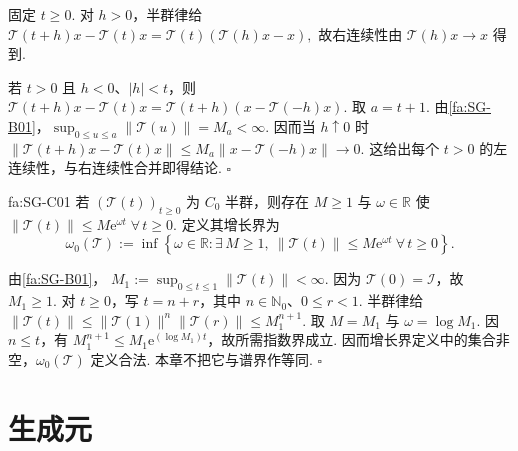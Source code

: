 \begin{FAProof}
固定 \(\displaystyle t\geqslant0\). 对 \(\displaystyle h>0\)，半群律给
\(\displaystyle \mathcal T(t+h)x-\mathcal T(t)x = \mathcal T(t)(\mathcal T(h)x-x),\)
故右连续性由 \(\displaystyle\mathcal T(h)x\to x\) 得到.

若 \(\displaystyle t>0\) 且 \(\displaystyle h<0\)、\(\displaystyle|h|<t\)，则
\(\displaystyle \mathcal T(t+h)x-\mathcal T(t)x = \mathcal T(t+h)(x-\mathcal T(-h)x).\)
取 \(\displaystyle a=t+1\). 由\autoref{fa:SG-B01}，\(\displaystyle\sup_{0\leqslant u\leqslant a}\|\mathcal T(u)\|=M_a<\infty\). 因而当 \(\displaystyle h\uparrow0\) 时
\(\displaystyle \|\mathcal T(t+h)x-\mathcal T(t)x\| \leqslant M_a\|x-\mathcal T(-h)x\| \longrightarrow0.\)
这给出每个 \(\displaystyle t>0\) 的左连续性，与右连续性合并即得结论.
\hfill\(\square\)
\end{FAProof}

\begin{FAProposition}[C][指数增长界与增长界]{fa:SG-C01}
若 \(\displaystyle(\mathcal T(t))_{t\geqslant0}\) 为 \(\displaystyle C_0\) 半群，则存在 \(\displaystyle M\geqslant1\) 与 \(\displaystyle\omega\in\mathbb R\) 使
\(\displaystyle \|\mathcal T(t)\| \leqslant M\mathrm{e}^{\omega t} \; \forall\,t\geqslant0.\)
定义其增长界为
\[
\omega_0(\mathcal T)
:=
\inf
\left\{
 \omega\in\mathbb R:
 \exists\,M\geqslant1,\
 \|\mathcal T(t)\|\leqslant M\mathrm{e}^{\omega t}
 \ \forall\,t\geqslant0
\right\}.
\]
\end{FAProposition}

\begin{FAProof}
由\autoref{fa:SG-B01}，
\(\displaystyle M_1:=\sup_{0\leqslant t\leqslant1}\|\mathcal T(t)\|<\infty.\)
因为 \(\displaystyle\mathcal T(0)=\mathcal I\)，故 \(\displaystyle M_1\geqslant1\). 对 \(\displaystyle t\geqslant0\)，写 \(\displaystyle t=n+r\)，其中 \(\displaystyle n\in\mathbb N_0\)、\(\displaystyle0\leqslant r<1\). 半群律给
\(\displaystyle \|\mathcal T(t)\| \leqslant \|\mathcal T(1)\|^n\|\mathcal T(r)\| \leqslant M_1^{n+1}.\)
取 \(\displaystyle M=M_1\) 与 \(\displaystyle\omega=\log M_1\). 因 \(\displaystyle n\leqslant t\)，有 \(\displaystyle M_1^{n+1}\leqslant M_1\mathrm{e}^{(\log M_1)t}\)，故所需指数界成立. 因而增长界定义中的集合非空，\(\displaystyle\omega_0(\mathcal T)\) 定义合法. 本章不把它与谱界作等同.
\hfill\(\square\)
\end{FAProof}

\section{生成元}\label{sec:ii08-generator}

